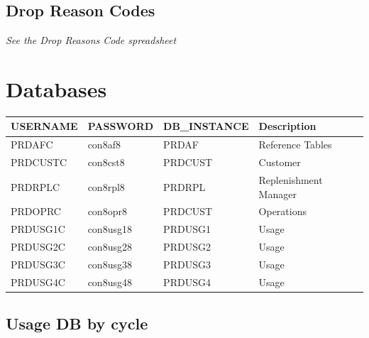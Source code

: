 \documentclass[12pt,twoside]{article}
\begin{document}
\normalsize
\subsection{Drop Reason Codes}
\label{sec-7-5}

   \emph{See the Drop Reasons Code spreadsheet}
\section{Databases}
\label{sec-8}


\footnotesize


\begin{center}
\begin{tabular}{llll}
\hline
 \textbf{USERNAME}  &  \textbf{PASSWORD}  &  \textbf{DB\_INSTANCE}  &  \textbf{Description}   \\
\hline
 PRDAFC             &  con8af8            &  PRDAF                  &  Reference Tables       \\
 PRDCUSTC           &  con8cst8           &  PRDCUST                &  Customer               \\
 PRDRPLC            &  con8rpl8           &  PRDRPL                 &  Replenishment Manager  \\
 PRDOPRC            &  con8opr8           &  PRDCUST                &  Operations             \\
 PRDUSG1C           &  con8usg18          &  PRDUSG1                &  Usage                  \\
 PRDUSG2C           &  con8usg28          &  PRDUSG2                &  Usage                  \\
 PRDUSG3C           &  con8usg38          &  PRDUSG3                &  Usage                  \\
 PRDUSG4C           &  con8usg48          &  PRDUSG4                &  Usage                  \\
\hline
\end{tabular}
\end{center}


\normalsize
\subsection{Usage DB by cycle}
\label{sec-8-1}

\scriptsize
\end{document}
